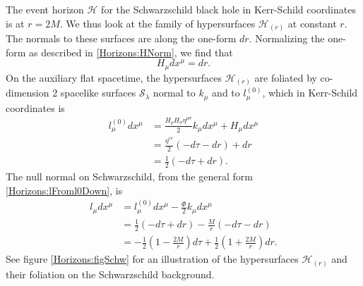 The event horizon $\mathcal{H}$ for the Schwarzschild black hole in Kerr-Schild coordinates is at $r = 2M$. We thus
look at the family of hypersurfaces $\mathcal{H}_{(r)}$ at constant $r$. The normals to these surfaces are along
the one-form $dr$. Normalizing the one-form as described in \eqref{Horizons:HNorm}, we find that 
\begin{equation}  
    H_{\mu}dx^{\mu} = dr.
\end{equation}
On the auxiliary flat spacetime, the hypersurfaces $\mathcal{H}_{(r)}$ are foliated by co-dimension 2 spacelike
surfaces $\mathcal{S}_{\lambda}$ normal to $k_{\mu}$ and to $l^{(0)}_{\mu}$, which in Kerr-Schild coordinates is
\begin{equation}  
    \begin{split}
        l^{(0)}_{\mu} dx^{\mu}
        &= \frac{H_{\rho}H_{\sigma}\eta^{\rho\sigma}}{2} k_{\mu} dx^{\mu} + H_{\mu} dx^{\mu} \\
        &= \frac{\eta^{rr}}{2} \left(-d\tau - dr\right) + dr \\
        &= \frac{1}{2} \left(-d\tau + dr\right).
    \end{split}
\end{equation}
The null normal on Schwarzschild, from the general form \eqref{Horizons:lFroml0Down}, is 
\begin{equation} 
    \begin{split}
        l_{\mu} dx^{\mu}
        &= l^{(0)}_{\mu} dx^{\mu} - \frac{\Phi}{2} k_{\mu} dx^{\mu} \\
        &= \frac{1}{2} \left(-d\tau  +dr\right) - \frac{M}{r} \left(-d\tau - dr\right) \\
        &= - \frac{1}{2} \left(1 - \frac{2M}{r}\right) d\tau + \frac{1}{2} \left(1 + \frac{2M}{r}\right) dr.
    \end{split}
\end{equation}
See figure \ref{Horizons:figSchw} for an illustration of the hypersurfaces $\mathcal{H}_{(r)}$ and their foliation on the
Schwarzschild background.
%
